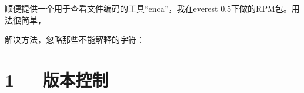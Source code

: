 \documentclass[letterpaper,12pt,english]{sphinxmanual}
\begin{document}
顺便提供一个用于查看文件编码的工具“enca”，我在everest 0.5下做的RPM包。用法很简单，

\begin{sphinxVerbatim}[commandchars=\\\{\}]
\end{sphinxVerbatim}

解决方法，忽略那些不能解释的字符：

\begin{sphinxVerbatim}[commandchars=\\\{\}]
         
\end{sphinxVerbatim}


\chapter{1   版本控制}
\label{\detokenize{001software/001install/_u7248_u672c_u63a7_u5236_u8f6f_u4ef6:id1}}\label{\detokenize{001software/001install/_u7248_u672c_u63a7_u5236_u8f6f_u4ef6::doc}}
\end{document}
